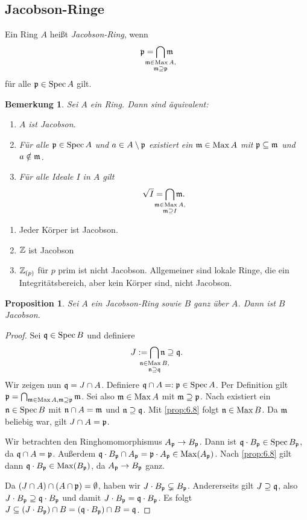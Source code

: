 \documentclass[12pt,a4paper]{scrartcl}
\theoremstyle{cplain}
\newtheorem{prop}[thmcounter]{Proposition}
\theoremstyle{cdef}
\newtheorem{beme}[thmcounter]{Bemerkung}
\begin{document}
\subsection{Jacobson-Ringe}
\begin{defi}
	Ein Ring $A$ heißt \emph{Jacobson-Ring}, wenn \[\fp = \bigcap_{\mathclap{\substack{\fm \in \Max A,\\ \fm \supseteq \fp}}} \fm\] für alle $\mathfrak{p} \in \operatorname{Spec} A$ gilt.
\end{defi}
\begin{beme} \label{bem7.19}
	Sei $A$ ein Ring. Dann sind äquivalent:
	\begin{enumerate}
		\item $A$ ist Jacobson.
		\item Für alle $\mathfrak{p} \in \operatorname{Spec} A$ und $a \in A \setminus \mathfrak{p}$ existiert ein $\mathfrak{m} \in \operatorname{Max} A$ mit $\mathfrak{p} \subseteq \mathfrak{m}$ und $a \notin \mathfrak{m}$.
		\item Für alle Ideale $I$ in $A$ gilt \[\sqrt{I}=\bigcap_{\mathclap{\substack{\fm \in \Max A,\\ \fm \supseteq I}}} \fm.\]
	\end{enumerate}
\end{beme}
\begin{bsp}
	\leavevmode
	\begin{enumerate}
		\item Jeder Körper ist Jacobson.
		\item $\mathbb Z$ ist Jacobson
		\item $\mathbb Z_{(p)}$ für $p$ prim ist nicht Jacobson. Allgemeiner sind lokale Ringe, die ein Integritätsbereich, aber kein Körper sind, nicht Jacobson.
	\end{enumerate}
\end{bsp}
\begin{prop}
	Sei $A$ ein Jacobson-Ring sowie $B$ ganz über $A$. Dann ist $B$ Jacobson.
\end{prop}
\begin{proof}
	Sei $\mathfrak{q} \in \operatorname{Spec} B$ und definiere \[J := \bigcap_{\mathclap{\substack{\fn \in \Max B,\\ \fn \supseteq \fq}}} \fn \supseteq \fq.\] Wir zeigen nun $\mathfrak{q}=J\cap A$. Definiere $\mathfrak{q} \cap A =: \mathfrak{p} \in \operatorname{Spec} A$. Per Definition gilt $\mathfrak{p}=\bigcap_{\mathfrak{m} \in \operatorname{Max} A, \mathfrak{m} \supseteq \mathfrak{p}} \mathfrak{m}$. Sei also $\mathfrak{m} \in \operatorname{Max} A$ mit $\mathfrak{m} \supseteq \mathfrak{p}$. Nach  existiert ein $\mathfrak{n} \in \operatorname{Spec} B$ mit $\mathfrak{n} \cap A = \mathfrak{m}$ und $\mathfrak{n} \supseteq \mathfrak{q}$. Mit \cref{prop:6.8} folgt $\mathfrak{n} \in \operatorname{Max} B$. Da $\mathfrak{m}$ beliebig war, gilt $J \cap A=\mathfrak{p}$.
	
	Wir betrachten den Ringhomomorphismus $A_{\mathfrak{p}} \to B_{\mathfrak{p}}$. Dann ist $\mathfrak{q} \cdot B_{\mathfrak{p}} \in \operatorname{Spec} B_{\mathfrak{p}}$, da $\mathfrak{q} \cap A = \mathfrak{p}$. Außerdem $\mathfrak{q} \cdot B_{\mathfrak{p}} \cap A_{\mathfrak{p}} = \mathfrak{p} \cdot A_{\mathfrak{p}} \in \operatorname{Max}(A_{\mathfrak{p}})$. Nach \cref{prop:6.8} gilt dann $\mathfrak{q} \cdot B_{\mathfrak{p}} \in \operatorname{Max}(B_{\mathfrak{p}})$, da $A_{\mathfrak{p}} \to B_{\mathfrak{p}}$ ganz.
	
	Da $(J \cap A)  \cap (A \cap \mathfrak{p})= \emptyset$, haben wir $J \cdot B_{\mathfrak{p}} \subsetneq B_{\mathfrak{p}}$. Andererseits gilt $J \supseteq \mathfrak{q}$, also $J \cdot B_{\mathfrak{p}} \supseteq \mathfrak{q} \cdot B_{\mathfrak{p}}$ und damit $J \cdot B_{\mathfrak{p}} = \mathfrak{q} \cdot B_{\mathfrak{p}}$. Es folgt $J \subseteq (J \cdot B_{\mathfrak{p}}) \cap B = (\mathfrak{q} \cdot B_{\mathfrak{p}}) \cap B = \mathfrak{q}$.
\end{proof}
\end{document}
